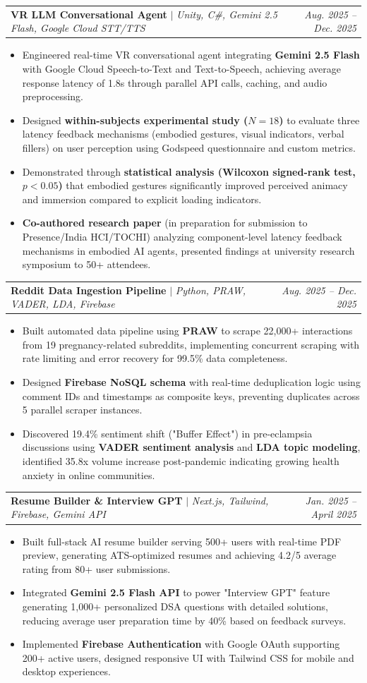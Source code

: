 \documentclass[letterpaper,11pt]{article}
\makeatletter
\newcommand{\resumeItemListStart}{\begin{itemize}[leftmargin=0.2in]}
\newcommand{\resumeItemListEnd}{\end{itemize}\vspace{1pt}}
\newcommand{\resumeItem}[1]{
  \item\small{#1 \vspace{-2pt}}
}
\newcommand{\resumeProjectHeading}[3]{
    \item
    \begin{tabular*}{0.97\textwidth}{l@{\extracolsep{\fill}}r}
      \small\textbf{#1} $|$ \footnotesize\emph{#2} & \textit{\small #3} \\
    \end{tabular*}\vspace{4pt} 
}
\makeatother
\begin{document}
    \resumeProjectHeading
        {\textbf{VR LLM Conversational Agent}}{Unity, C\#, Gemini 2.5 Flash, Google Cloud STT/TTS}{Aug. 2025 -- Dec. 2025}
        \resumeItemListStart
            \resumeItem{Engineered real-time VR conversational agent integrating \textbf{Gemini 2.5 Flash} with Google Cloud Speech-to-Text and Text-to-Speech, achieving average response latency of 1.8s through parallel API calls, caching, and audio preprocessing.}
            \resumeItem{Designed \textbf{within-subjects experimental study ($N=18$)} to evaluate three latency feedback mechanisms (embodied gestures, visual indicators, verbal fillers) on user perception using Godspeed questionnaire and custom metrics.}
            \resumeItem{Demonstrated through \textbf{statistical analysis (Wilcoxon signed-rank test, $p<0.05$)} that embodied gestures significantly improved perceived animacy and immersion compared to explicit loading indicators.}
            \resumeItem{\textbf{Co-authored research paper} (in preparation for submission to Presence/India HCI/TOCHI) analyzing component-level latency feedback mechanisms in embodied AI agents, presented findings at university research symposium to 50+ attendees.}
        \resumeItemListEnd

    \resumeProjectHeading
        {\textbf{Reddit Data Ingestion Pipeline}}{Python, PRAW, VADER, LDA, Firebase}{Aug. 2025 -- Dec. 2025}
        \resumeItemListStart
            \resumeItem{Built automated data pipeline using \textbf{PRAW} to scrape 22,000+ interactions from 19 pregnancy-related subreddits, implementing concurrent scraping with rate limiting and error recovery for 99.5\% data completeness.}
            \resumeItem{Designed \textbf{Firebase NoSQL schema} with real-time deduplication logic using comment IDs and timestamps as composite keys, preventing duplicates across 5 parallel scraper instances.}
            \resumeItem{Discovered 19.4\% sentiment shift ("Buffer Effect") in pre-eclampsia discussions using \textbf{VADER sentiment analysis} and \textbf{LDA topic modeling}, identified 35.8x volume increase post-pandemic indicating growing health anxiety in online communities.}
        \resumeItemListEnd

    \resumeProjectHeading
        {\textbf{Resume Builder \& Interview GPT}}{Next.js, Tailwind, Firebase, Gemini API}{Jan. 2025 -- April 2025}
        \resumeItemListStart
            \resumeItem{Built full-stack AI resume builder serving 500+ users with real-time PDF preview, generating ATS-optimized resumes and achieving 4.2/5 average rating from 80+ user submissions.}
            \resumeItem{Integrated \textbf{Gemini 2.5 Flash API} to power "Interview GPT" feature generating 1,000+ personalized DSA questions with detailed solutions, reducing average user preparation time by 40\% based on feedback surveys.}
            \resumeItem{Implemented \textbf{Firebase Authentication} with Google OAuth supporting 200+ active users, designed responsive UI with Tailwind CSS for mobile and desktop experiences.}
        \resumeItemListEnd
\end{document}
